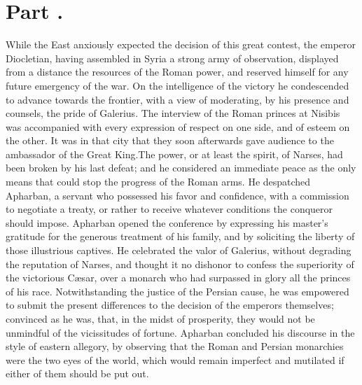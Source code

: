 \section{Part \thesection.}
\thispagestyle{simple}

While the East anxiously expected the decision of this great
contest, the emperor Diocletian, having assembled in Syria a
strong army of observation, displayed from a distance the
resources of the Roman power, and reserved himself for any future
emergency of the war. On the intelligence of the victory he
condescended to advance towards the frontier, with a view of
moderating, by his presence and counsels, the pride of Galerius.
The interview of the Roman princes at Nisibis was accompanied
with every expression of respect on one side, and of esteem on
the other. It was in that city that they soon afterwards gave
audience to the ambassador of the Great King.\footnotemark[74] The power, or at
least the spirit, of Narses, had been broken by his last defeat;
and he considered an immediate peace as the only means that could
stop the progress of the Roman arms. He despatched Apharban, a
servant who possessed his favor and confidence, with a commission
to negotiate a treaty, or rather to receive whatever conditions
the conqueror should impose. Apharban opened the conference by
expressing his master’s gratitude for the generous treatment of
his family, and by soliciting the liberty of those illustrious
captives. He celebrated the valor of Galerius, without degrading
the reputation of Narses, and thought it no dishonor to confess
the superiority of the victorious Cæsar, over a monarch who had
surpassed in glory all the princes of his race. Notwithstanding
the justice of the Persian cause, he was empowered to submit the
present differences to the decision of the emperors themselves;
convinced as he was, that, in the midst of prosperity, they would
not be unmindful of the vicissitudes of fortune. Apharban
concluded his discourse in the style of eastern allegory, by
observing that the Roman and Persian monarchies were the two eyes
of the world, which would remain imperfect and mutilated if
either of them should be put out.


